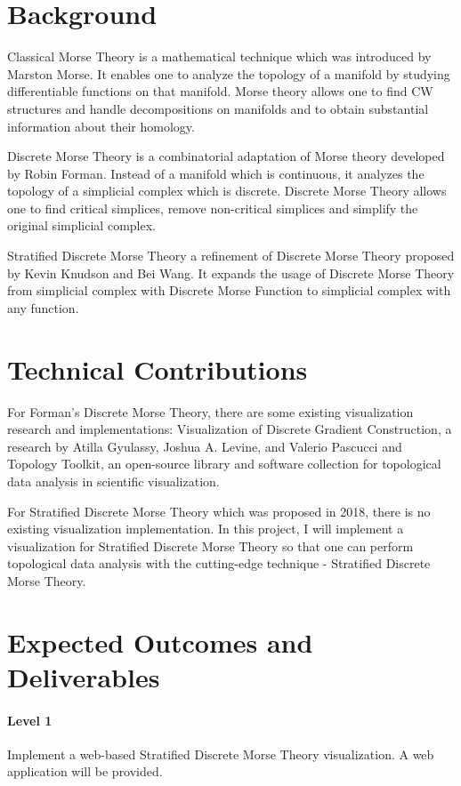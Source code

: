 \documentclass[12pt]{article}
\begin{document}
\section{Background}
Classical Morse Theory is a mathematical technique which was introduced by Marston Morse. It enables one to analyze the topology of a manifold by studying differentiable functions on that manifold. Morse theory allows one to find CW structures and handle decompositions on manifolds and to obtain substantial information about their homology.

Discrete Morse Theory is a combinatorial adaptation of Morse theory developed by Robin Forman. Instead of a manifold which is continuous, it analyzes the topology of a simplicial complex which is discrete. Discrete Morse Theory allows one to find critical simplices, remove non-critical simplices and simplify the original simplicial complex.

Stratified Discrete Morse Theory a refinement of Discrete Morse Theory proposed by Kevin Knudson and Bei Wang. It expands the usage of Discrete Morse Theory from simplicial complex with Discrete Morse Function to simplicial complex with any function.

\section{Technical Contributions}
For Forman's Discrete Morse Theory, there are some existing visualization research and implementations: Visualization of Discrete Gradient Construction, a research by Atilla Gyulassy, Joshua A. Levine, and Valerio Pascucci and Topology Toolkit, an open-source library and software collection for topological data analysis in scientific visualization.

For Stratified Discrete Morse Theory which was proposed in 2018, there is no existing visualization implementation. In this project, I will implement a visualization for Stratified Discrete Morse Theory so that one can perform topological data analysis with the cutting-edge technique - Stratified Discrete Morse Theory.

\section{Expected Outcomes and Deliverables}
\paragraph{Level 1} Implement a web-based Stratified Discrete Morse Theory visualization. A web application will be provided.
\end{document}
